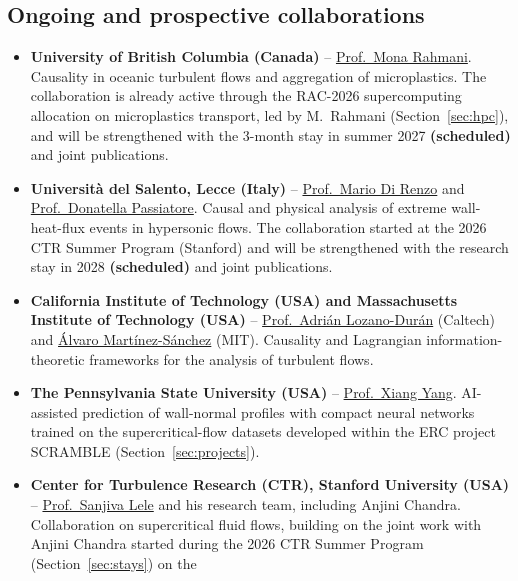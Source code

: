 \documentclass[11pt]{article}
\newcommand{\NEW}[1]{\iffinal #1\else{\color{red}#1}\fi} %
\begin{document}
\subsection{Ongoing \NEW{and prospective} collaborations}\label{sec:collab}
\begin{itemize}
  \item \textbf{University of British Columbia (Canada)} --
  \href{https://chbe.ubc.ca/mona-rahmani/}{Prof.\ Mona Rahmani}. Causality in oceanic
  turbulent flows and aggregation of microplastics. The collaboration is already active
  through the RAC-2026 supercomputing allocation on microplastics transport, led by M.\ Rahmani
  (Section~\ref{sec:hpc}), and will be strengthened with the 3-month stay in summer 2027 \textbf{(scheduled)}
  and joint publications.
  \item \textbf{Universit\`a del Salento, Lecce (Italy)} --
  \href{https://www.unisalento.it/scheda-utente/-/people/mario.direnzo}{Prof.\ Mario Di Renzo}
  and \href{https://www.unisalento.it/scheda-utente/-/people/donatella.passiatore}{Prof.\ Donatella Passiatore}.
  Causal and physical analysis of extreme wall-heat-flux events in hypersonic flows. The
  collaboration started at the 2026 CTR Summer Program (Stanford) and will be strengthened
  with the research stay in 2028 \textbf{(scheduled)} and joint publications.
  \item \textbf{California Institute of Technology (USA) and Massachusetts Institute of
  Technology (USA)} --
  \href{https://www.eas.caltech.edu/people/adrian-lozano-duran}{Prof.\ Adri\'an
  Lozano-Dur\'an} (Caltech) and
  \href{https://sites.google.com/view/alvaro-martinez-sanchez/about-me}{\'Alvaro
  Mart\'inez-S\'anchez} (MIT). Causality and Lagrangian information-theoretic frameworks
  for the analysis of turbulent flows.
  \item \textbf{The Pennsylvania State University (USA)} --
  \href{https://www.me.psu.edu/department/directory-detail-g.aspx?q=xzy48}{Prof.\ Xiang
  Yang}. AI-assisted prediction of wall-normal profiles with compact neural networks
  trained on the supercritical-flow datasets developed within the ERC project SCRAMBLE
  (Section~\ref{sec:projects}).
  \item \textbf{Center for Turbulence Research (CTR), Stanford University (USA)} --
  \href{https://me.stanford.edu/people/sanjiva-lele}{Prof.\ Sanjiva Lele} and his research team,
  including Anjini Chandra. Collaboration on supercritical fluid flows, building on the joint work
  with Anjini Chandra started during the 2026 CTR Summer Program (Section~\ref{sec:stays}) on the

\end{itemize}
\end{document}
